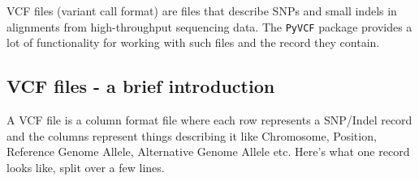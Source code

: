 \documentclass[]{book}
\theoremstyle{definition}
\theoremstyle{definition}
\theoremstyle{definition}
\theoremstyle{remark}
\begin{document}
VCF files (variant call format) are files that describe SNPs and small
indels in alignments from high-throughput sequencing data. The
\texttt{PyVCF} package provides a lot of functionality for working with
such files and the record they contain.

\hypertarget{vcf-files---a-brief-introduction}{%
\subsection{VCF files - a brief
introduction}\label{vcf-files---a-brief-introduction}}

A VCF file is a column format file where each row represents a SNP/Indel
record and the columns represent things describing it like Chromosome,
Position, Reference Genome Allele, Alternative Genome Allele etc. Here's
what one record looks like, split over a few lines.
\end{document}
